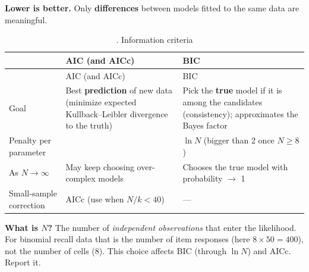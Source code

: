 \textbf{Lower is better.} Only \textbf{differences} between models
fitted to the same data are meaningful.

\begin{longtable}[]{@{}
  >{\raggedright\arraybackslash}p{}
  >{\raggedright\arraybackslash}p{}
  >{\raggedright\arraybackslash}p{}@{}}
\caption{. Information criteria}\tabularnewline
\toprule\noalign{}
\begin{minipage}[b]{\linewidth}\raggedright
\end{minipage} & \begin{minipage}[b]{\linewidth}\raggedright
AIC (and AICc)
\end{minipage} & \begin{minipage}[b]{\linewidth}\raggedright
BIC
\end{minipage} \\
\midrule\noalign{}
\endfirsthead
\toprule\noalign{}
\begin{minipage}[b]{\linewidth}\raggedright
\end{minipage} & \begin{minipage}[b]{\linewidth}\raggedright
AIC (and AICc)
\end{minipage} & \begin{minipage}[b]{\linewidth}\raggedright
BIC
\end{minipage} \\
\midrule\noalign{}
\endhead
\bottomrule\noalign{}
\endlastfoot
Goal & Best \textbf{prediction} of new data (minimize expected
Kullback--Leibler divergence to the truth) & Pick the \textbf{true}
model if it is among the candidates (consistency); approximates the
Bayes factor \\
Penalty per parameter & 2 & \(\ln N\) (bigger than 2 once
\(N \ge 8\)) \\
As \(N \to \infty\) & May keep choosing over-complex models & Chooses
the true model with probability \ensuremath{\rightarrow} 1 \\
Small-sample correction & AICc (use when \(N/k < 40\)) & --- \\
\end{longtable}

\textbf{What is \(N\)?} The number of \emph{independent observations}
that enter the likelihood. For binomial recall data that is the number
of item responses (here \(8 \times 50 = 400\)), not the number of cells
(8). This choice affects BIC (through \(\ln N\)) and AICc. Report it.

